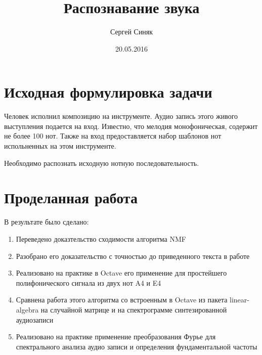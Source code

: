 \documentclass[unicode]{beamer}
\title{Распознавание звука}
\author{Сергей Синяк}
\date{20.05.2016}
\begin{document}
\begin{frame}
	\titlepage
\end{frame}

\section{Исходная формулировка задачи}
\begin{frame}
  Человек исполнил композицию на инструменте. Аудио запись этого
  живого выступления подается на вход. Известно, что мелодия
  монофоническая, содержит не более 100 нот. Также на вход
  предоставляется набор шаблонов нот испольненных на этом
  инструменте.

  Необходимо распознать исходную нотную последовательность.
\end{frame}

\section{Проделанная работа}

\begin{frame}
   В результате было сделано:
  \begin{enumerate}
    \item Переведено доказтельство сходимости алгоритма NMF 
    \item Разобрано его доказательство с точностью до приведенного
      текста в работе
    \item Реализовано на практике в Octave его применение
      для простейшего полифонического сигнала из двух нот A4 и E4
    \item Сравнена работа этого алгоритма со встроенным в Octave
      из пакета linear-algebra на случайной матрице и на спектрограмме
      синтезированной аудиозаписи
    \item Реализовано на практике применение преобразования Фурье
      для спектрального анализа аудио записи и определения фундаментальной
      частоты
  \end{enumerate}
\end{frame}
\end{document}
